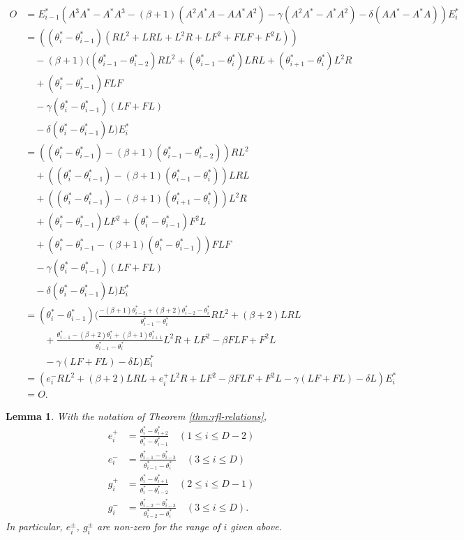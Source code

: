 \documentclass[
]{book}
\newtheorem{lemma}{Lemma}[chapter]
\theoremstyle{definition}
\theoremstyle{definition}
\theoremstyle{definition}
\theoremstyle{definition}
\theoremstyle{remark}
\begin{document}
\begin{align}
O & = E^*_{i-1}(A^3A^*-A^*A^3-(\beta+1)(A^2A^*A-AA^*A^2)-\gamma(A^2A^*-A^*A^2)-\delta(AA^*-A^*A))E^*_i\\
& = ((\theta^*_i-\theta^*_{i-1})(RL^2+ LRL + L^2R + LF^2 + FLF + F^2L))\\
& \quad -(\beta+1)((\theta^*_{i-1}-\theta^*_{i-2})RL^2 + (\theta^*_{i-1}-\theta^*_i)LRL + (\theta^*_{i+1}-\theta^*_i)L^2R\\
& \quad + (\theta^*_i-\theta^*_{i-1})FLF\\
& \quad - \gamma(\theta^*_i-\theta^*_{i-1})(LF+FL)\\
& \quad - \delta(\theta^*_i-\theta^*_{i-1})L)E^*_i\\
& = ((\theta^*_i-\theta^*_{i-1})-(\beta+1)(\theta^*_{i-1}-\theta^*_{i-2}))RL^2 \\
& \quad + ((\theta^*_i-\theta^*_{i-1})-(\beta+1)(\theta^*_{i-1}-\theta^*_{i}))LRL\\
& \quad + ((\theta^*_i-\theta^*_{i-1})-(\beta+1)(\theta^*_{i+1}-\theta^*_{i}))L^2R\\
& \quad + (\theta^*_{i}-\theta^*_{i-1})LF^2 + (\theta^*_i-\theta^*_{i-1})F^2L\\
& \quad + (\theta^*_i - \theta^*_{i-1}-(\beta+1)(\theta^*_i-\theta^*_{i-1}))FLF\\
& \quad - \gamma(\theta^*_i-\theta^*_{i-1})(LF+FL)\\
& \quad - \delta (\theta^*_i-\theta^*_{i-1})L)E^*_i\\
& = (\theta^*_i-\theta^*_{i-1})\biggl(\frac{-(\beta+1)\theta^*_{i-2}+(\beta+2)\theta^*_{i-2}-\theta^*_i}{\theta^*_{i-1}-\theta^*_i}RL^2+(\beta+2)LRL\\
& \qquad + \frac{\theta^*_{i-1}-(\beta+2)\theta^*_i+(\beta+1)\theta^*_{i+1}}{\theta^*_{i-1}-\theta^*_i}L^2R + LF^2 - \beta FLF + F^2L\\
& \qquad -\gamma(LF+FL) - \delta L\biggr)E^*_i\\
& = (e^-_iRL^2 + (\beta+2)LRL + e^+_iL^2R + LF^2 - \beta FLF + F^2L-\gamma(LF+FL)-\delta L)E^*_i\\
& = O.
\end{align}

\begin{lemma}
\protect\hypertarget{lem:epm-gpm}{}\label{lem:epm-gpm}With the notation of Theorem \ref{thm:rfl-relations},
\begin{align}
e^+_i & = \frac{\theta^*_i-\theta^*_{i+2}}{\theta^*_i-\theta^*_{i-1}} \quad (1\leq i\leq D-2)\\
e^-_i & = \frac{\theta^*_{i-1}-\theta^*_{i-3}}{\theta^*_{i-1}-\theta^*_{i}} \quad (3\leq i\leq D)\\
g^+_i & = \frac{\theta^*_i-\theta^*_{i+1}}{\theta^*_i-\theta^*_{i-2}} \quad (2\leq i\leq D-1)\\
g^-_i & = \frac{\theta^*_{i-2}-\theta^*_{i-3}}{\theta^*_{i-2}-\theta^*_{i}} \quad (3\leq i\leq D).
\end{align}
In particular, \(e^\pm_i\), \(g^\pm_i\) are non-zero for the range of \(i\) given above.
\end{lemma}
\end{document}
